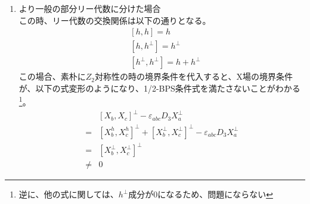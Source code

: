 \documentclass[dvipdfmx,a4paper,10.5pt]{article}
\numberwithin{equation}{section}
\newenvironment{proofbox}
{\begin{prooflabel}\textbf{証明：}\end{prooflabel}\vspace{0.8em}}
{\par\vspace{1em}\hrule\vspace{1em}}
\begin{document}
\begin{enumerate}
\begin{proofbox}
これらの式は、以下の式に帰着される。
\begin{equation}\begin{split}
    \bar{\epsilon}_{0}\theta^{h}=0&,\quad 
    \bar{\epsilon}_{0}B_{0}\theta^{\perp}=0
\end{split} \end{equation}
この際、注意事項として、$\theta$はあくまで以下のように定義された量である。
\begin{equation}\begin{split}
    &\Gamma^{3}\Psi=\psi^{h}\otimes \theta^{h}+\psi^{\perp}\otimes \theta^{\perp}\\
    \implies &\Psi=\Psi^{h}+\Psi^{\perp}=\Gamma^{3}\psi^{h}\otimes \theta^{h}+\Gamma^{3}\psi^{\perp}\otimes \theta^{\perp}
\end{split} \end{equation}
故に、上記の固有値による境界条件を$\Psi^{h},\Psi^{\perp}$の言葉に直すと、$\Gamma^{3}$と$B_{1}$の反可換性から、以下のような境界条件が成立する。
\begin{align*}
    B_{1}\Psi^{h}|&=\Psi,\quad B_{1}\Psi^{\perp}=-\Psi^{\perp}
\end{align*}
残りの式は、上記が全て満たされると自動的に成立する。\\
\\
故に、D5-likeの場合において、上記のBoundary conditionで$\frac{1}{2}$-BPSを保つ。
    \end{proofbox}
    \item より一般の部分リー代数に分けた場合\\
    この時、リー代数の交換関係は以下の通りとなる。
     \begin{align*}
        &[h,h]=h\\
        &[h,h^{\perp}]=h^{\perp}\\
        &[h^{\perp},h^{\perp}]=h+h^{\perp}
    \end{align*}
    この場合、素朴に$Z_{2}$対称性の時の境界条件を代入すると、X場の境界条件が、以下の式変形のようになり、1/2-BPS条件式を満たさないことがわかる\footnote{逆に、他の式に関しては、$h^{\perp}$成分が0になるため、問題にならない}。
    \begin{align*}
        &[X_{b},X_{c}]^{\perp}-\varepsilon_{abc}D_{3}X_{a}^{\perp}\\
        =
        &[X_{b}^{h},X_{c}^{h}]^{\perp} +[X_{b}^{\perp},X_{c}^{\perp}]^{\perp}-\varepsilon_{abc}D_{3}X_{a}^{\perp}\\
        =&[X_{b}^{\perp},X_{c}^{\perp}]^{\perp}\\
        \neq& 0

\end{align*}
\end{enumerate}
\end{document}
